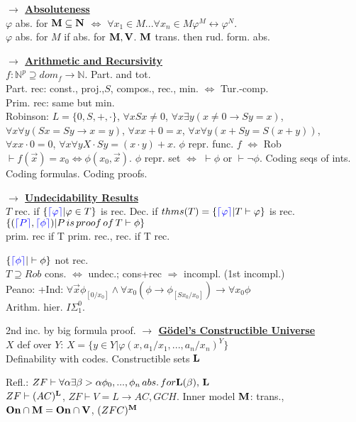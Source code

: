 \documentclass[9pt]{article}
\newcommand{\class}[1]{{\bf #1}}
\newcommand{\N}{\mathbb{N}}
\newcommand{\code}[1]{{\color{blue}\lceil#1\rceil}}
\newcommand{\mytitle}[1]{ {\bf $\rightarrow$ \underline{#1}}\\}
\begin{document}
\begin{multicols*}{2}
\mytitle{Absoluteness}
$\varphi$ abs. for $\class{M}\subseteq\class{N}$ $\Leftrightarrow$ $\forall x_1\in M...\forall x_n\in M \varphi^M\leftrightarrow\varphi^N$.\\
$\varphi$ abs. for $M$ if abs. for $\class{M}, \class{V}$.
$\class{M}$ trans. then rud. form. abs.

\mytitle{Arithmetic and Recursivity}
$f\colon \N^p\supseteq dom_f\to \N$. Part. and tot.\\
Part. rec: const., proj.,$S$, compos., rec., min. $\Leftrightarrow$ Tur.-comp.\\
Prim. rec: same but min.\\
Robinson: $L=\{0,S,+,\cdot\}$, $\forall x Sx\neq 0$, $\forall x\exists y (x\neq 0\to Sy=x)$, $\forall x \forall y (Sx=Sy\to x=y)$, $\forall x x+0=x$, $\forall x\forall y (x+Sy=S(x+y))$, $\forall x x\cdot 0=0$, $\forall x\forall y X\cdot Sy=(x\cdot y)+x$.
$\phi$ repr. func. $f$ $\Leftrightarrow$ Rob$\vdash f(\vec{x})=x_0\Leftrightarrow\phi(x_0,\vec{x})$. $\phi$ repr. set $\Leftrightarrow$ $\vdash\phi$ or $\vdash\neg\phi$. Coding seqs of ints. Coding formulas. Coding proofs.

\mytitle{Undecidability Results}
$T$ rec. if $\{\code{\varphi}|\varphi\in T\}$ is rec. Dec. if $thms(T)=\{\code{\varphi}|T\vdash\varphi\}$ is rec.\\
$\{(\code{P},\code{\phi})|P\,is\,proof\,of\,T\vdash\phi\}$\\
prim. rec if T prim. rec., rec. if T rec.

$\{\code{\phi}|\vdash\phi\}$ not rec.\\
$T\supseteq Rob$ cons. $\Leftrightarrow$ undec.; cons+rec $\Rightarrow$ incompl. (1st incompl.)\\
Peano: +Ind: $\forall \vec{x}\phi_{[0/x_0]}\wedge\forall x_0(\phi\to \phi_{[Sx_0/x_0]})\to\forall x_0\phi$\\
Arithm. hier. $I\Sigma_1^0$.

2nd inc. by big formula proof.
\mytitle{G\"odel's Constructible Universe}
$X$ def over $Y$: $X=\{y\in Y|\varphi(x,a_1/x_1,...,a_n/x_n)^Y\}$\\
Definability with codes. Constructible sets $\class{L}$

Refl.: $ZF\vdash \forall\alpha\exists\beta>\alpha \phi_0,...,\phi_n\,abs.\,for \class{L}(\beta),\,\class{L}$\\
$ZF\vdash (AC)^{\class{L}}$, $ZF\vdash V=L\to AC, GCH$.
Inner model $\class{M}$: trans., $\class{On}\cap\class{M}=\class{On}\cap\class{V}$, $(ZFC)^\class{M}$


\end{multicols*}
\end{document}
